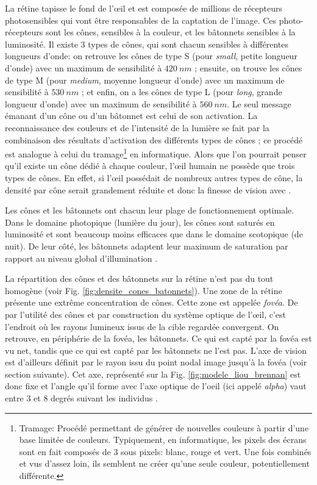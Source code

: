 	\par La rétine tapisse le fond de l'œil et est composée de millions de récepteurs photosensibles qui vont être responsables de la captation de l'image. Ces photo-récepteurs sont les cônes, sensibles à la couleur, et les bâtonnets sensibles à la luminosité. Il existe 3 types de cônes, qui sont chacun sensibles à différentes longueurs d'onde: on retrouve les cônes de type S (pour \textit{small}, petite longueur d'onde) avec un maximum de sensibilité à $420~nm$ ; ensuite, on trouve les cônes de type M (pour \textit{medium}, moyenne longueur d'onde) avec un maximum de sensibilité à $530~nm$ ; et enfin, on a les cônes de type L (pour \textit{long}, grande longueur d'onde) avec un maximum de sensibilité à $560~nm$. Le seul message émanant d'un cône ou d'un bâtonnet est celui de son activation. La reconnaissance des couleurs et de l'intensité de la lumière se fait par la combinaison des résultats d'activation des différents types de cônes ; ce procédé est analogue à celui du tramage\footnote{Tramage: Procédé permettant de générer de nouvelles couleurs à partir d'une base limitée de couleurs. Typiquement, en informatique, les pixels des écrans sont en fait composés de 3 sous pixels: blanc, rouge et vert. Une fois combinés et vus d'assez loin, ils semblent ne créer qu'une seule couleur, potentiellement différente.} en informatique. Alors que l'on pourrait penser qu'il existe un cône dédié à chaque couleur, l'œil humain ne possède que trois types de cônes. En effet, si l'œil possédait de nombreux autres types de cône, la densité par cône serait grandement réduite et donc la finesse de vision avec \citep{glassner_principles_1995}.
	
	\par Les cônes et les bâtonnets ont chacun leur plage de fonctionnement optimale. Dans le domaine photopique (lumière du jour), les cônes sont saturés en luminosité et sont beaucoup moins efficaces que dans le domaine scotopique (de nuit). De leur côté, les bâtonnets adaptent leur maximum de saturation par rapport au niveau global d'illumination \citep{glassner_principles_1995}.
	
	\par La répartition des cônes et des bâtonnets sur la rétine n'est pas du tout homogène (voir Fig. \ref{fig:densite_cones_batonnets}). Une zone de la rétine présente une extrême concentration de cônes. Cette zone est appelée \textit{fovéa}. De par l'utilité des cônes et par construction du système optique de l'œil, c'est l'endroit où les rayons lumineux issus de la cible regardée convergent. On retrouve, en périphérie de la fovéa, les bâtonnets. Ce qui est capté par la fovéa est vu net, tandis que ce qui est capté par les bâtonnets ne l'est pas. L'axe de vision est d'ailleurs définit par le rayon issu du point nodal image jusqu'à la fovéa (voir section suivante). Cet axe, représenté sur la Fig. \ref{fig:modele_liou_brennan} est donc fixe et l'angle qu'il forme avec l'axe optique de l'oeil (ici appelé \textit{alpha}) vaut entre 3 et 8 degrés suivant les individus \citep{gross_human_2008}.
	
